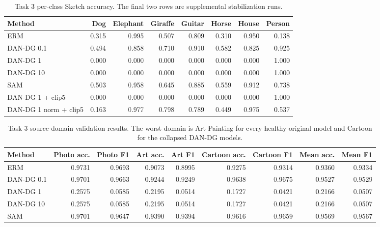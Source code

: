 \documentclass{article}
\begin{document}
\begin{table}[h]
  \caption{Task 3 per-class Sketch accuracy. The final two rows are supplemental stabilization runs.}
  \label{tab:t3-perclass}
  \centering
  \scriptsize
  \begin{tabular}{lrrrrrrr}
    \toprule
    Method & Dog & Elephant & Giraffe & Guitar & Horse & House & Person \\
    \midrule
    ERM & 0.315 & 0.995 & 0.507 & 0.809 & 0.310 & 0.950 & 0.138 \\
    DAN-DG 0.1 & 0.494 & 0.858 & 0.710 & 0.910 & 0.582 & 0.825 & 0.925 \\
    DAN-DG 1 & 0.000 & 0.000 & 0.000 & 0.000 & 0.000 & 0.000 & 1.000 \\
    DAN-DG 10 & 0.000 & 0.000 & 0.000 & 0.000 & 0.000 & 0.000 & 1.000 \\
    SAM & 0.503 & 0.958 & 0.645 & 0.885 & 0.559 & 0.912 & 0.738 \\
    \midrule
    DAN-DG 1 + clip5 & 0.000 & 0.000 & 0.000 & 0.000 & 0.000 & 0.000 & 1.000 \\
    DAN-DG 1 norm + clip5 & 0.163 & 0.977 & 0.798 & 0.789 & 0.449 & 0.975 & 0.537 \\
    \bottomrule
  \end{tabular}
\end{table}

\begin{table}[h]
  \caption{Task 3 source-domain validation results. The worst domain is Art Painting for every healthy original model and Cartoon for the collapsed DAN-DG models.}
  \label{tab:t3-source}
  \centering
  \scriptsize
  \begin{tabular}{lrrrrrrrr}
    \toprule
    Method & Photo acc. & Photo F1 & Art acc. & Art F1 & Cartoon acc. & Cartoon F1 & Mean acc. & Mean F1 \\
    \midrule
    ERM & 0.9731 & 0.9693 & 0.9073 & 0.8995 & 0.9275 & 0.9314 & 0.9360 & 0.9334 \\
    DAN-DG 0.1 & 0.9701 & 0.9663 & 0.9244 & 0.9249 & 0.9638 & 0.9675 & 0.9527 & 0.9529 \\
    DAN-DG 1 & 0.2575 & 0.0585 & 0.2195 & 0.0514 & 0.1727 & 0.0421 & 0.2166 & 0.0507 \\
    DAN-DG 10 & 0.2575 & 0.0585 & 0.2195 & 0.0514 & 0.1727 & 0.0421 & 0.2166 & 0.0507 \\
    SAM & 0.9701 & 0.9647 & 0.9390 & 0.9394 & 0.9616 & 0.9659 & 0.9569 & 0.9567 \\
    \bottomrule
  \end{tabular}
\end{table}
\end{document}
